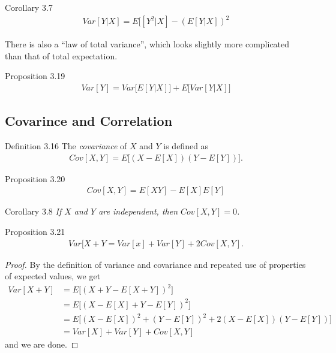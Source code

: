 \begin{boks}{Corollary 3.7}
  \begin{align*}
    Var[Y|X] = E\Big[[Y^2|X] - (E[Y|X])^2
  \end{align*}
\end{boks}

There is also a ``law of total variance'', which looks slightly more complicated than that of total expectation.

\begin{boks}{Proposition 3.19}
  \begin{align*}
    Var[Y] = Var\Big[ E[Y|X] \Big] + E\Big[Var[Y|X]\Big]
  \end{align*}
\end{boks}

\subsection{Covarince and Correlation}

\begin{boks}{Definition 3.16}
  The \textit{covariance} of $X$ and $Y$ is defined as
  \begin{align*}
    Cov[X, Y] = E\Big[(X - E[X])(Y - E[Y])\Big].
  \end{align*}
\end{boks}

\begin{boks}{Proposition 3.20}
  \begin{align*}
    Cov[X, Y] = E[XY] - E[X]E[Y]
  \end{align*}
\end{boks}

\begin{boks}{Corollary 3.8}
  \textit{If $X$ and $Y$ are independent, then $Cov[X, Y] = 0$.}
\end{boks}

\begin{boks}{Proposition 3.21}
  \begin{align*}
    Var[X + Y = Var[x] + Var[Y] + 2Cov[X, Y].
  \end{align*}
\end{boks}

\begin{proof}
  By the definition of variance and covariance and repeated use of properties of expected values, we get
  \begin{align*}
    Var[X + Y] &= E\Big[(X + Y - E[X + Y])^2]\\
    &= E\Big[(X - E[X] + Y - E[Y])^2]\\
    &= E\Big[(X - E[X])^2 + (Y - E[Y])^2 + 2(X - E[X])(Y - E[Y])]\\
    &= Var[X] + Var[Y] + Cov[X, Y]
  \end{align*}
  and we are done.
\end{proof}

